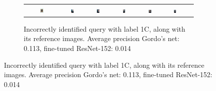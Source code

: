 \begin{figure}
\begin{subfigure}{\textwidth}
\begin{tabular}{|c|*{6}{c}}
\includegraphics[width=0.12\textwidth]{img/1C-0454.JPG} &
\includegraphics[width=0.12\textwidth]{img/1C-0.JPG} &
\includegraphics[width=0.12\textwidth]{img/1C-1.JPG} &
\includegraphics[width=0.12\textwidth]{img/1C-2.JPG} &
\includegraphics[width=0.12\textwidth]{img/1C-3.JPG} &
\includegraphics[width=0.12\textwidth]{img/1C-4.JPG} \\
\end{tabular}
\caption{Incorrectly identified query with label 1C,
along with its reference images.\newline
Average precision Gordo's net: 0.113, fine-tuned ResNet-152: 0.014
\label{fig:incorrect1C}}
\end{subfigure}


\end{figure}
